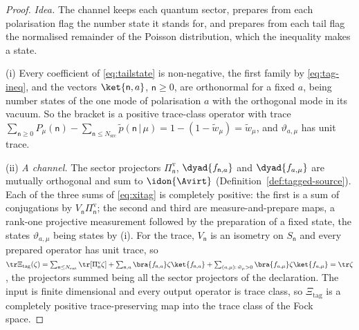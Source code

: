 \begin{proof}
\emph{Idea.} The channel keeps each quantum sector, prepares from each
polarisation flag the number state it stands for, and prepares from each tail
flag the normalised remainder of the Poisson distribution, which the
inequality makes a state.

(i) Every coefficient of \eqref{eq:tailstate} is non-negative, the first family
by \eqref{eq:tag-ineq}, and the vectors $\ket{\mathsf{n},a}$, $\mathsf{n}\ge0$,
are orthonormal for a fixed $a$, being number states of the one mode of
polarisation $a$ with the orthogonal mode in its vacuum. So the bracket is a
positive trace-class operator with trace
$\sum_{\mathsf{n}\ge0}P_\mu(\mathsf{n})
-\sum_{\mathsf{n}\le N_{\mathrm{src}}}\tilde p(\mathsf{n}\,|\,\mu)
=1-(1-\tilde w_\mu)=\tilde w_\mu$, and $\vartheta_{a,\mu}$ has unit trace.

(ii) \emph{A channel.} The sector projectors $\Pi^{\mathrm v}_{\mathsf{n}}$,
$\dyad{f_{\mathsf{n},a}}$ and $\dyad{f_{a,\mu}}$ are mutually orthogonal and sum
to $\idon{\Avirt}$ (Definition~\ref{def:tagged-source}). Each of the three sums
of \eqref{eq:xitag} is completely positive: the first is a sum of conjugations
by $V_{\mathsf{n}}\Pi^{\mathrm v}_{\mathsf{n}}$; the second and third are
measure-and-prepare maps, a rank-one projective measurement followed by the
preparation of a fixed state, the states $\vartheta_{a,\mu}$ being states by
(i). For the trace, $V_{\mathsf{n}}$ is an isometry on $S_{\mathsf{n}}$ and
every prepared operator has unit trace, so
$\tr\Xi_{\mathrm{tag}}(\zeta)=\sum_{\mathsf{n}\le N_{\mathrm{ent}}}
\tr[\Pi^{\mathrm v}_{\mathsf{n}}\zeta]
+\sum_{\mathsf{n},a}\bra{f_{\mathsf{n},a}}\zeta\ket{f_{\mathsf{n},a}}
+\sum_{(a,\mu):\,\tilde w_\mu>0}\bra{f_{a,\mu}}\zeta\ket{f_{a,\mu}}
=\tr\zeta$, the projectors summed being all the sector projectors of the
declaration. The input is finite dimensional and every output operator is trace
class, so $\Xi_{\mathrm{tag}}$ is a completely positive trace-preserving map
into the trace class of the Fock space.


\end{proof}
